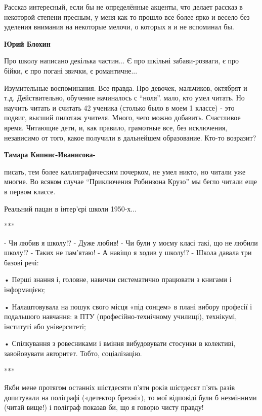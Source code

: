 \begin{itemize}

Рассказ интересный, если бы не определённые акценты, что делает рассказ в
некоторой степени пресным, у меня как-то прошло все более ярко и весело без
уделения внимания на некоторые мелочи, о которых я и не вспоминал бы.

\textbf{Юрий Блохин} 

Про школу написано декілька частин... Є про шкільні забави-розваги, є про
бійки, є про погані звички, є романтичне...


Изумительные воспоминания. Все правда. Про девочек, мальчиков, октябрят и т.д.
Действительно, обучение начиналось с \enquote{ноля}. мало, кто умел читать. Но научить
читать и считать 42 ученика (столько было в моем 1 классе) - это подвиг, высший
пилотаж учителя. Много, чего можно добавить. Счастливое время. Читающие дети,
и, как правило, грамотные все, без исключения, независимо от того, какое
получили в дальнейшем образование. Кто-то возразит?

\begin{itemize} %
\textbf{Тамара Кипнис-Иванисова-} 

писать, тем более каллиграфическим почерком, не умел никто, но читали уже
многие. Во всяком случае \enquote{Приключения Робинзона Крузо} мы бегло читали еще в
первом классе.

\end{itemize} %


Реальний пацан в інтер’єрі школи 1950-х...

***

- Чи любив я школу!?
- Дуже любив!
- Чи були у моєму класі такі, що не любили школу!?
- Таких не пам’ятаю!
- А навіщо я ходив у школу!?
- Школа давала три базові речі:

• Перші знання і, головне, навички систематично працювати з книгами і
інформацією;

• Налаштовувала на пошук свого місця «під сонцем» в плані вибору професії і
подальшого навчання: в ПТУ (професійно-технічному училищі), технікумі,
інституті або університеті;

• Спілкування з ровесниками і вміння вибудовувати стосунки в колективі,
завойовувати авторитет. Тобто, соціалізацію.

***

Якби мене протягом останніх шістдесяти п'яти років шістдесят п'ять разів
допитували на поліграфі («детектор брехні»), то мої відповіді були б незмінними
(читай вище!) і поліграф показав би, що я говорю чисту правду!


\end{itemize}
